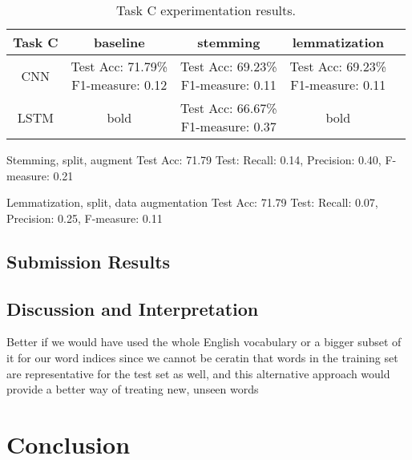 \documentclass[11pt,a4paper]{article}
\begin{document}
\begin{table*}[!htb]
\begin{center}
\begin{tabular}{|c|cccc|}
\hline \bf Task C & \bf baseline & \bf stemming & \bf lemmatization & \\ \hline
CNN & \shortstack{Test Acc: 71.79\% \\ F1-measure: 0.12}  & \shortstack{Test Acc: 69.23\% \\ F1-measure: 0.11} & \shortstack{Test Acc: 69.23\% \\ F1-measure: 0.11} & \\ \hline
LSTM & bold & \shortstack{Test Acc: 66.67\% \\ F1-measure: 0.37} & bold & \\
\hline
\end{tabular}
\end{center}
\caption{\label{font-table} Task C experimentation results. }
\label{table:3}
\end{table*}

Stemming, split, augment
Test Acc: 71.79%
Test: Recall: 0.14, Precision: 0.40, F-measure: 0.21

Lemmatization, split, data augmentation
Test Acc: 71.79%
Test: Recall: 0.07, Precision: 0.25, F-measure: 0.11

\subsection{Submission Results}

\subsection{Discussion and Interpretation}

Better if we would have used the whole English vocabulary or a bigger subset of it for our word indices since we cannot be ceratin that words in the training set are representative for the test set as well, and this alternative approach would provide a better way of treating new, unseen words

\section{Conclusion}



\end{document}
